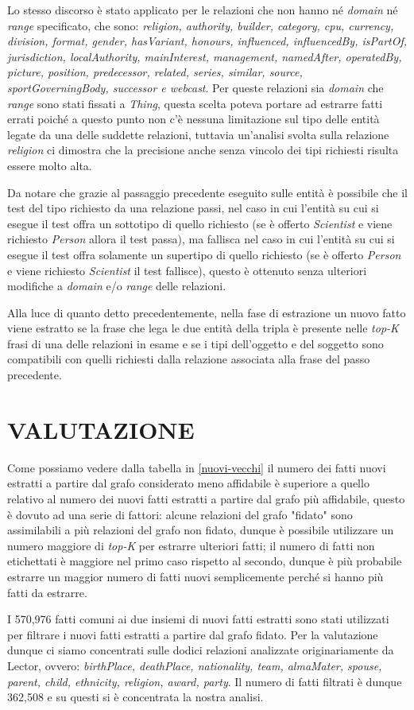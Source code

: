 \documentclass[10pt,a4paper,twocolumn]{article}
\begin{document}
Lo stesso discorso è stato applicato per le relazioni che non hanno né \textit{domain} né \textit{range} specificato, che sono: \textit{religion, authority, builder, category, cpu, currency, division, format, gender, hasVariant, honours, influenced, influencedBy, isPartOf, jurisdiction, localAuthority, mainInterest, management, namedAfter, operatedBy, picture, position, predecessor, related, series, similar, source, sportGoverningBody, successor e webcast}. Per queste relazioni sia \textit{domain} che \textit{range} sono stati fissati a \textit{Thing}, questa scelta poteva portare ad estrarre fatti errati poiché a questo punto non c'è nessuna limitazione sul tipo delle entità legate da una delle suddette relazioni, tuttavia un'analisi svolta sulla relazione \textit{religion} ci dimostra che la precisione anche senza vincolo dei tipi richiesti risulta essere molto alta. 

Da notare che grazie al passaggio precedente eseguito sulle entità è possibile che il test del tipo richiesto da una relazione passi, nel caso in cui l'entità su cui si esegue il test offra un sottotipo di quello richiesto (se è offerto \textit{Scientist} e viene richiesto \textit{Person} allora il test passa), ma fallisca nel caso in cui l'entità su cui si esegue il test offra solamente un supertipo di quello richiesto (se è offerto \textit{Person} e viene richiesto \textit{Scientist} il test fallisce), questo è ottenuto senza ulteriori modifiche a \textit{domain} e/o \textit{range} delle relazioni.

Alla luce di quanto detto precedentemente, nella fase di estrazione un nuovo fatto viene estratto se la frase che lega le due entità della tripla è presente nelle \textit{top-K} frasi di una delle relazioni in esame e se i tipi dell'oggetto e del soggetto sono compatibili con quelli richiesti dalla relazione associata alla frase del passo precedente.  


\section{VALUTAZIONE}

Come possiamo vedere dalla tabella in \ref{nuovi-vecchi} il numero dei fatti nuovi estratti a partire dal grafo considerato meno affidabile è superiore a quello relativo al numero dei nuovi fatti estratti a partire dal grafo più affidabile, questo è dovuto ad una serie di fattori: alcune relazioni del grafo "fidato" sono assimilabili a più relazioni del grafo non fidato, dunque è possibile utilizzare un numero maggiore di \textit{top-K} per estrarre ulteriori fatti; il numero di fatti non etichettati è maggiore nel primo caso rispetto al secondo, dunque è più probabile estrarre un maggior numero di fatti nuovi semplicemente perché si hanno più fatti da estrarre.

I 570,976 fatti comuni ai due insiemi di nuovi fatti estratti sono stati utilizzati per filtrare i nuovi fatti estratti a partire dal grafo fidato. Per la valutazione dunque ci siamo concentrati sulle dodici relazioni analizzate originariamente da Lector, ovvero:
\textit{birthPlace, deathPlace, nationality, team, almaMater, spouse, parent, child, ethnicity, religion, award, party}. Il numero di fatti filtrati è dunque 362,508 e su questi si è concentrata la nostra analisi.
\end{document}

